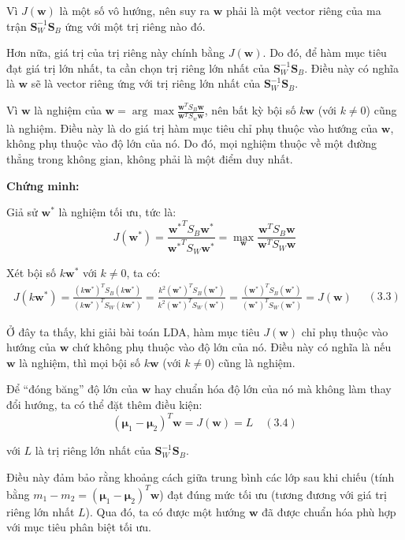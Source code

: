 \documentclass[
  a4paper,
]{article}
\begin{document}
Vì \(J(\mathbf{w})\) là một số vô hướng, nên suy ra \(\mathbf{w}\) phải
là một vector riêng của ma trận \(\mathbf{S}_W^{-1} \mathbf{S}_B\) ứng
với một trị riêng nào đó.

Hơn nữa, giá trị của trị riêng này chính bằng \(J(\mathbf{w})\). Do đó,
để hàm mục tiêu đạt giá trị lớn nhất, ta cần chọn trị riêng lớn nhất của
\(\mathbf{S}_W^{-1} \mathbf{S}_B\). Điều này có nghĩa là \(\mathbf{w}\)
sẽ là vector riêng ứng với trị riêng lớn nhất của
\(\mathbf{S}_W^{-1} \mathbf{S}_B\).

Vì \(\mathbf{w}\) là nghiệm của
\(\mathbf{w} = \arg\max \frac{\mathbf{w}^T S_B \mathbf{w}}{\mathbf{w}^T S_w \mathbf{w}}\),
nên bất kỳ bội số \(k \mathbf{w}\) (với \(k \neq 0\)) cũng là nghiệm.
Điều này là do giá trị hàm mục tiêu chỉ phụ thuộc vào hướng của
\(\mathbf{w}\), không phụ thuộc vào độ lớn của nó. Do đó, mọi nghiệm
thuộc về một đường thẳng trong không gian, không phải là một điểm duy
nhất.

\textbf{Chứng minh:}

Giả sử \(\mathbf{w}^*\) là nghiệm tối ưu, tức là:
\[J(\mathbf{w^*}) =\frac{\mathbf{w^*}^T S_B \mathbf{w^*}}{\mathbf{w^*}^T S_W \mathbf{w^*}} = \max_{\mathbf{w}} \frac{\mathbf{w}^T S_B \mathbf{w}}{\mathbf{w}^T S_W \mathbf{w}}\]

Xét bội số \(k \mathbf{w}^*\) với \(k \neq 0\), ta có: \[
\begin{aligned}
J(k\mathbf{w^*}) =
\frac{(k\mathbf{w}^*)^T S_B (k\mathbf{w}^*)}{(k\mathbf{w}^*)^T S_W (k\mathbf{w}^*)}  
= \frac{k^2 (\mathbf{w}^*)^T S_B (\mathbf{w}^*)}{k^2 (\mathbf{w}^*)^T S_W (\mathbf{w}^*)} 
= \frac{(\mathbf{w}^*)^T S_B (\mathbf{w}^*)}{(\mathbf{w}^*)^T S_W (\mathbf{w}^*)} = J(\mathbf{w})
\end{aligned} \quad (3.3)
\]

Ở đây ta thấy, khi giải bài toán LDA, hàm mục tiêu \(J(\mathbf{w})\) chỉ
phụ thuộc vào hướng của \(\mathbf{w}\) chứ không phụ thuộc vào độ lớn
của nó. Điều này có nghĩa là nếu \(\mathbf{w}\) là nghiệm, thì mọi bội
số \(k\mathbf{w}\) (với \(k \neq 0\)) cũng là nghiệm.

Để ``đóng băng'' độ lớn của \(\mathbf{w}\) hay chuẩn hóa độ lớn của nó
mà không làm thay đổi hướng, ta có thể đặt thêm điều kiện:
\[(\boldsymbol{\mu}_1 - \boldsymbol{\mu}_2)^T \mathbf{w} = J(\mathbf{w}) = L \quad (3.4)\]

với \(L\) là trị riêng lớn nhất của \(\mathbf{S}_W^{-1}\mathbf{S}_B\).

Điều này đảm bảo rằng khoảng cách giữa trung bình các lớp sau khi chiếu
(tính bằng
\(m_1 - m_2 = (\boldsymbol{\mu}_1 - \boldsymbol{\mu}_2)^T \mathbf{w}\))
đạt đúng mức tối ưu (tương đương với giá trị riêng lớn nhất \(L\)). Qua
đó, ta có được một hướng \(\mathbf{w}\) đã được chuẩn hóa phù hợp với
mục tiêu phân biệt tối ưu.
\end{document}
